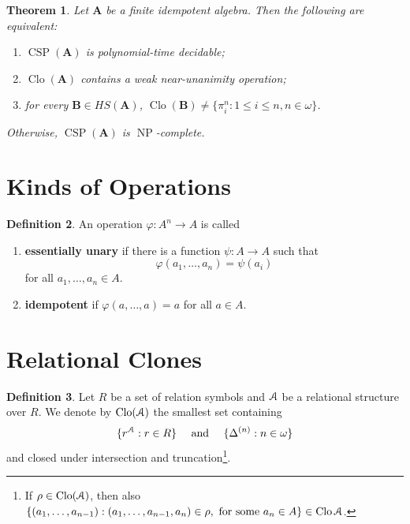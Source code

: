 \documentclass{amsart}
\theoremstyle{plain}
\newtheorem{theorem}{Theorem}[section]
\theoremstyle{definition}
\newtheorem{definition}[theorem]{Definition}
\theoremstyle{remark}
\def\phi{\varphi}
\DeclareMathOperator{\Clo}{Clo}
\DeclareMathOperator{\CSP}{CSP}
\DeclareMathOperator{\NP}{NP}
\begin{document}
\begin{theorem}
    Let $\mathbf{A}$ be a finite idempotent algebra. 
    Then the following are equivalent: 
    \begin{enumerate}
        \item $\CSP(\mathbf{A})$ is polynomial-time decidable; 
        \item $\Clo(\mathbf{A})$ contains a weak near-unanimity operation; 
        \item for every $\mathbf{B} \in HS(\mathbf{A})$, $\Clo(\mathbf{B}) \neq \{\pi^n_i: 1 \le i \le n, n \in \omega\}$. 
    \end{enumerate}
    Otherwise, $\CSP(\mathbf{A})$ is $\NP$-complete. 
\end{theorem}

\section{Kinds of Operations}

\begin{definition}
    An operation $\phi: A^n \to A$ is called 
    \begin{enumerate}
        \item \textbf{essentially unary} if there is a function $\psi: A \to A$ such that 
        \begin{equation*}
        \phi(a_1, \ldots, a_n) = \psi(a_i)
        \end{equation*}
        for all $a_1, \ldots, a_n \in A$. 
        \item \textbf{idempotent} if $\phi(a, \ldots, a)=a$ for all $a \in A$. 
    \end{enumerate}
\end{definition}

\section{Relational Clones} 
\begin{definition}
    Let $R$ be a set of relation symbols and $\EuScript{A}$ be a relational structure over $R$.
    We denote by $\Clo(\EuScript{A})$ the smallest set containing 
    \begin{equation*}
        \{r^\EuScript{A} : r \in R\} \quad \text{ and } \quad \{\Delta^{(n)} : n \in \omega\}
    \end{equation*}
    and closed under intersection and truncation\footnote{If $\rho \in \Clo(\EuScript{A})$, then also $\{(a_1, \ldots, a_{n-1}): (a_1, \ldots, a_{n-1}, a_n) \in \rho, \text{ for some } a_n \in A \} \in \Clo{\EuScript{A}}$.}.
\end{definition}
\end{document}
